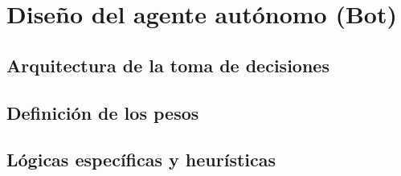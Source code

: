 \chapter{Diseño del agente autónomo (Bot)} \label{chap:software_bot}


\section{Arquitectura de la toma de decisiones} \label{sec:arquitectura_toma_decisiones}


\section{Definición de los pesos} \label{sec:definicion_pesos}


\section{Lógicas específicas y heurísticas} \label{sec:logicas_especificas}
